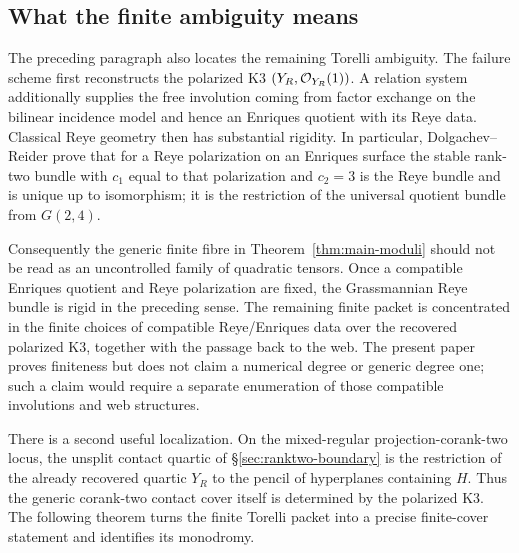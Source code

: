 \subsection{What the finite ambiguity means}

The preceding paragraph also locates the remaining Torelli ambiguity.
The failure scheme first reconstructs the polarized K3
$(Y_R,\mathcal O_{Y_R}(1))$.  A relation system additionally supplies the
free involution coming from factor exchange on the bilinear incidence
model and hence an Enriques quotient with its Reye data.  Classical
Reye geometry then has substantial rigidity.  In particular,
Dolgachev--Reider prove that for a Reye polarization on an Enriques
surface the stable rank-two bundle with
$c_1$ equal to that polarization and $c_2=3$ is the Reye bundle and
is unique up to isomorphism; it is the restriction of the universal
quotient bundle from $G(2,4)$.

Consequently the generic finite fibre in
Theorem~\ref{thm:main-moduli} should not be read as an uncontrolled
family of quadratic tensors.  Once a compatible Enriques quotient and
Reye polarization are fixed, the Grassmannian Reye bundle is rigid in
the preceding sense.  The remaining finite packet is concentrated in
the finite choices of compatible Reye/Enriques data over the recovered
polarized K3, together with the passage back to the web.  The present
paper proves finiteness but does not claim a numerical degree or
generic degree one; such a claim would require a separate enumeration
of those compatible involutions and web structures.

There is a second useful localization.  On the mixed-regular
projection-corank-two locus, the unsplit contact quartic of
\S\ref{sec:ranktwo-boundary} is the restriction of the already
recovered quartic $Y_R$ to the pencil of hyperplanes containing $H$.
Thus the generic corank-two contact cover itself is determined by the
polarized K3.  The following theorem turns the finite Torelli packet
into a precise finite-cover statement and identifies its monodromy.


